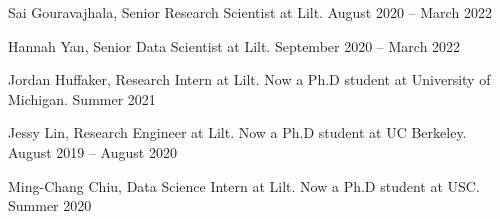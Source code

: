
Sai Gouravajhala, Senior Research Scientist at Lilt. \hfill August 2020 -- March 2022

Hannah Yan, Senior Data Scientist at Lilt. \hfill September 2020 -- March 2022

Jordan Huffaker, Research Intern at Lilt. Now a Ph.D student at University of Michigan. \hfill Summer 2021

Jessy Lin, Research Engineer at Lilt. Now a Ph.D student at UC Berkeley. \hfill August 2019 -- August 2020

Ming-Chang Chiu, Data Science Intern at Lilt. Now a Ph.D student at USC. \hfill Summer 2020\\





